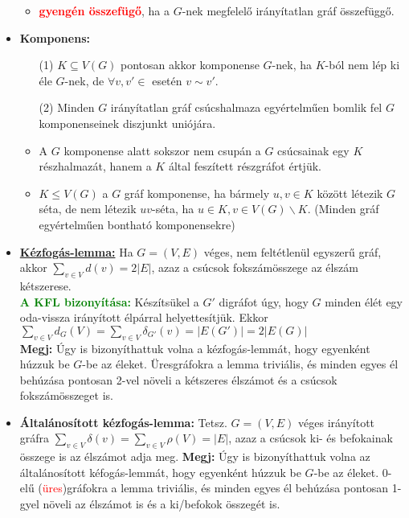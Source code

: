 \documentclass[../../szobeli.tex]{subfiles}
\begin{document}
\begin{itemize}
\begin{itemize}
            \item \textcolor{red}{\textbf{gyengén összefügő}}, ha a $G$-nek megfelelő irányítatlan gráf összefüggő.
        \end{itemize}
        \item \textbf{Komponens:} \begin{itemize}
            \item[(1)] $K \subseteq V(G)$ pontosan akkor komponense $G$-nek, ha $K$-ból nem lép ki éle $G$-nek, de $\forall v,v' \in$ esetén $v \sim v'$.
            \item[(2)] Minden $G$ irányítatlan gráf csúcshalmaza egyértelműen bomlik fel $G$ komponenseinek diszjunkt uniójára.
            \item A $G$ komponense alatt sokszor nem csupán a $G$ csúcsainak egy $K$ részhalmazát, hanem a $K$ által feszített részgráfot értjük. 
            \item $K \leq V(G)$ a $G$ gráf komponense, ha bármely $u,v \in K$ között létezik $G$ séta, de nem létezik $uv$-séta, ha $u\in K, v\in V(G)\backslash K$. (Minden gráf egyértelműen bontható komponensekre)
        \end{itemize}
        \item \underline{\textbf{Kézfogás-lemma:}} Ha $G = (V,E)$ véges, nem feltétlenül egyszerű gráf, akkor $\sum_{v \in V} d(v)=2|E|$, azaz a csúcsok fokszámösszege az élszám kétszerese. \\ \textcolor{green}{\textbf{A KFL bizonyítása:}} Készítsükel a $G'$ digráfot úgy, hogy $G$ minden élét egy oda-vissza irányított élpárral helyettesítjük. Ekkor $\sum_{v \in V} d_G(V) = \sum_{v \in V} \delta_{G'} (v) = |E(G')| = 2|E(G)|$ \\ \textbf{Megj:} Úgy is bizonyíthattuk volna a kézfogás-lemmát, hogy egyenként húzzuk be $G$-be az éleket. Üresgráfokra a lemma triviális, és minden egyes él behúzása pontosan 2-vel növeli a kétszeres élszámot és a csúcsok fokszámösszeget is.
        \item \textbf{Általánosított kézfogás-lemma:} Tetsz. $G = (V,E)$ véges irányított gráfra $\sum_{v \in V} \delta (v) = \sum_{v \in V} \rho (V) = |E|$, azaz a csúcsok ki- és befokainak összege is az élszámot adja meg. \textbf{Megj:} Úgy is bizonyíthattuk volna az általánosított kéfogás-lemmát, hogy egyenként húzzuk be $G$-be az éleket. 0-elű (\textcolor{red}{üres})gráfokra a lemma triviális, és minden egyes él behúzása pontosan 1-gyel növeli az élszámot is és a ki/befokok összegét is.
        
    \end{itemize}
\end{document}
